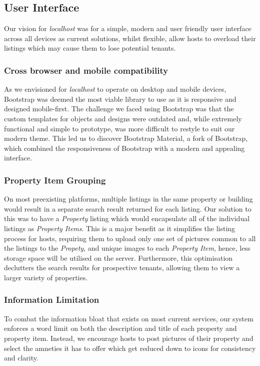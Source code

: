 \subsection{User Interface}
Our vision for \emph{localhost} was for a simple, modern and user friendly user
interface across all devices as current solutions, whilst flexible, allow hosts
to overload their listings which may cause them to lose potential tenants.

\subsubsection{Cross browser and mobile compatibility}

As we envisioned for \emph{localhost} to operate on desktop and mobile devices,
Bootstrap was deemed the most viable library to use as it is responsive and
designed mobile-first. The challenge we faced using Bootstrap was that the custom
templates for objects and designs were outdated and, while extremely functional
and simple to prototype, was more difficult to restyle to suit our modern theme.
This led us to discover Bootstrap Material, a fork of Bootstrap, which combined
the responsiveness of Bootstrap with a modern and appealing interface.

\subsubsection{Property Item Grouping}
On most preexisting platforms, multiple listings in the same property or building
would result in a separate search result returned for each listing. Our solution
to this was to have a \emph{Property} listing which would encapsulate all of the
individual listings as \emph{Property Items}. This is a major benefit as it
simplifies the listing process for hosts, requiring them to upload only one set
of pictures common to all the listings to the \emph{Propety}, and unique images
to each \emph{Property Item}, hence, less storage space will be utilised on the
server. Furthermore, this optimisation declutters the search results for
prospective tenants, allowing them to view a larger variety of properties.

\subsubsection{Information Limitation}
To combat the information bloat that exists on most current services, our system
enforces a word limit on both the description and title of each property and
property item. Instead, we encourage hosts to post pictures of their property and
select the amneties it has to offer which get reduced down to icons for
consistency and clarity.

